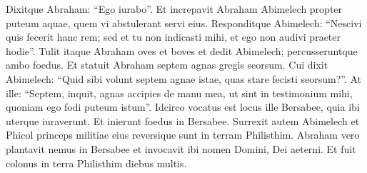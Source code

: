 \begin{biblechapter}
\begin{biblechapter}
\begin{biblechapter}
\begin{biblechapter}
\begin{biblechapter}
\begin{biblechapter}
\begin{biblechapter}
\begin{biblechapter}
\begin{biblechapter}
\begin{biblechapter}
\begin{biblechapter}
\begin{biblechapter}
\begin{biblechapter}
\begin{biblechapter}
\begin{biblechapter}
\begin{biblechapter}
\begin{biblechapter}
\begin{biblechapter}
\begin{biblechapter}
\begin{biblechapter}
\begin{biblechapter}
\verse Dixitque Abraham: “Ego iurabo”.
 \verse Et increpavit Abraham Abimelech propter puteum aquae, quem vi abstulerant servi eius. 
\verse Responditque Abimelech: “Nescivi quis fecerit hanc rem; sed et tu non indicasti mihi, et ego non audivi praeter hodie”. 
\verse Tulit itaque Abraham oves et boves et dedit Abimelech; percusseruntque ambo foedus.
 \verse Et statuit Abraham septem agnas gregis seorsum. 
\verse Cui dixit Abimelech: “Quid sibi volunt septem agnae istae, quas stare fecisti seorsum?”. 
\verse At ille: “Septem, inquit, agnas accipies de manu mea, ut sint in testimonium mihi, quoniam ego fodi puteum istum”. 
\verse Idcirco vocatus est locus ille Bersabee, quia ibi uterque iuraverunt. 
\verse Et inierunt foedus in Bersabee.
 \verse Surrexit autem Abimelech et Phicol princeps militiae eius reversique sunt in terram Philisthim. Abraham vero plantavit nemus in Bersabee et invocavit ibi nomen Domini, Dei aeterni. \verse Et fuit colonus in terra Philisthim diebus multis.
 

\end{biblechapter}
\end{biblechapter}
\end{biblechapter}
\end{biblechapter}
\end{biblechapter}
\end{biblechapter}
\end{biblechapter}
\end{biblechapter}
\end{biblechapter}
\end{biblechapter}
\end{biblechapter}
\end{biblechapter}
\end{biblechapter}
\end{biblechapter}
\end{biblechapter}
\end{biblechapter}
\end{biblechapter}
\end{biblechapter}
\end{biblechapter}
\end{biblechapter}
\end{biblechapter}
